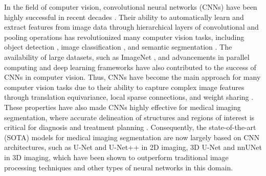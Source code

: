 \documentclass{article}
\begin{document}
In the field of computer vision, convolutional neural networks (CNNs) have been highly successful in recent decades \cite{3,4,5,6}. Their ability to automatically learn and extract features from image data through hierarchical layers of convolutional and pooling operations has revolutionized many computer vision tasks, including object detection \cite{7,zhang2024meddet,cai2024msdet,cai2024medical}, image classification \cite{3,4,5,6,ji2024sine}, and semantic segmentation \cite{8,ge2024esa,tan2024segkan,zhang2025gamed}. The availability of large datasets, such as ImageNet \cite{9}, and advancements in parallel computing and deep learning frameworks have also contributed to the success of CNNs in computer vision. Thus, CNNs have become the main approach for many computer vision tasks due to their ability to capture complex image features through translation equivariance, local sparse connections, and weight sharing \cite{10}. These properties have also made CNNs highly effective for medical imaging segmentation, where accurate delineation of structures and regions of interest is critical for diagnosis and treatment planning \cite{zhang2024deep,hiwase2025can,zhao2024landmark,qi2025projectedex}. Consequently, the state-of-the-art (SOTA) models for medical imaging segmentation are now largely based on CNN architectures, such as U-Net \cite{11} and U-Net++ \cite{12} in 2D imaging, 3D U-Net \cite{13} and nnUNet \cite{14} in 3D imaging, which have been shown to outperform traditional image processing techniques and other types of neural networks in this domain. 
\end{document}
